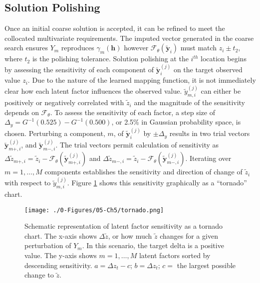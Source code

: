 \subsection{Solution Polishing}
\label{subsec:polish}

Once an initial coarse solution is accepted, it can be refined to meet the collocated multivariate requirements. The imputed vector generated in the coarse search ensures $Y_{m}$ reproduces $\gamma_{m}(\mathbf{h})$ however $\mathcal{F}_{\theta}(\tilde{\mathbf{y}}_{i})$ must match $z_{i} \pm t_{2}$, where $t_{2}$ is the polishing tolerance. Solution polishing at the $i^{th}$ location begins by assessing the sensitivity of each component of  $\tilde{\mathbf{y}}_{i}^{(j)}$ on the target observed value $z_{i}$. Due to the nature of the learned mapping function, it is not immediately clear how each latent factor influences the observed value. $\tilde{y}_{m, i}^{(j)}$ can either be positively or negatively correlated with $\tilde{z}_{i}$ and the magnitude of the sensitivity depends on $\mathcal{F}_{\theta}$. To assess the sensitivity of each factor, a step size of $\Delta_{y} = G^{-1}(0.525)-G^{-1}(0.500)$, or 2.5\% in Gaussian probability space, is chosen. Perturbing a component, $m$, of $\tilde{\mathbf{y}}^{(j)}_{i}$ by $\pm \Delta_{y}$ results in two trial vectors $\tilde{\mathbf{y}}_{m+, i}^{(j)}$, and $\tilde{\mathbf{y}}_{m-,i}^{(j)}$. The trial vectors permit calculation of sensitivity as  $\Delta\tilde{z}_{m+,i} = \tilde{z}_{i} - \mathcal{F}_{\theta}(\tilde{\mathbf{y}}_{m+, i}^{(j)})$ and $\Delta\tilde{z}_{m-,i} = \tilde{z}_{i} - \mathcal{F}_{\theta}(\tilde{\mathbf{y}}_{m-,i}^{(j)})$. Iterating over $m=1,\dots,M$ components establishes the sensitivity and direction of change of $\tilde{z}_{i}$ with respect to $\tilde{y}_{m, i}^{(j)}$. Figure \ref{fig:tornado} shows this sensitivity graphically as a ``tornado'' chart.

\begin{figure}[htb!]
    \centering
    \texttt{[image: ./0-Figures/05-Ch5/tornado.png]}
    \caption{Schematic representation of latent factor sensitivity as a tornado chart. The x-axis shows $\Delta \tilde{z}$, or how much $\tilde{z}$ changes for a given perturbation of $Y_{m}$. In this scenario, the target delta is a positive value. The y-axis shows $m=1,\dots,M$ latent factors sorted by descending sensitivity. $a = \Delta z_{t} - c$; $b=\Delta z_{t}$; $c=$ the largest possible change to $\tilde{z}$.}
    \label{fig:tornado}
\end{figure}

